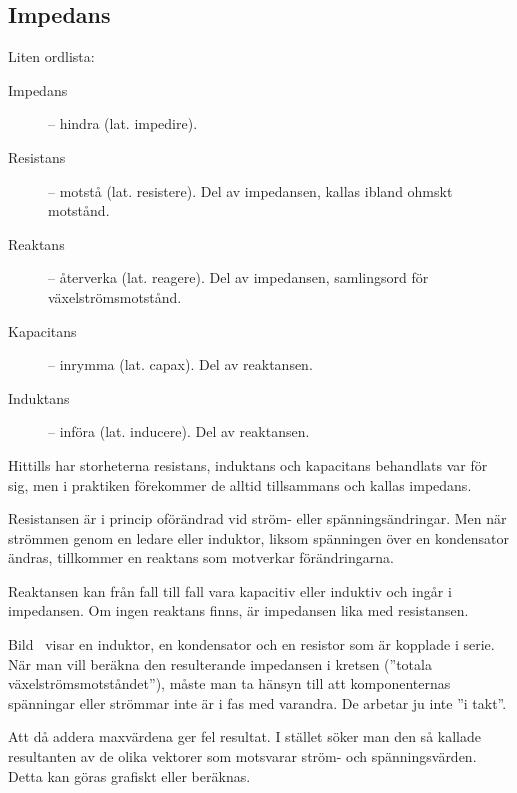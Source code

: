 \subsection{Impedans}
\label{impedans}

Liten ordlista:
\begin{description}
\item[Impedans] -- hindra (lat. impedire).
\item[Resistans] -- motstå (lat. resistere).
  Del av impedansen, kallas ibland ohmskt motstånd.
\item[Reaktans] -- återverka (lat. reagere).
  Del av impedansen, samlingsord för växelströmsmotstånd.
\item[Kapacitans] -- inrymma (lat. capax). Del av reaktansen.
\item[Induktans] -- införa (lat. inducere). Del av reaktansen.
\end{description}

Hittills har storheterna resistans, induktans och kapacitans behandlats var för
sig, men i praktiken förekommer de alltid tillsammans och kallas impedans.

Resistansen är i princip oförändrad vid ström- eller spänningsändringar.
Men när strömmen genom en ledare eller induktor, liksom spänningen över en
kondensator ändras, tillkommer en reaktans som motverkar förändringarna.

Reaktansen kan från fall till fall vara kapacitiv eller induktiv och ingår i
impedansen.
Om ingen reaktans finns, är impedansen lika med resistansen.


Bild~ visar en induktor, en kondensator och en resistor
som är kopplade i serie.
När man vill beräkna den resulterande impedansen i kretsen
(''totala växelströmsmotståndet''), måste man ta hänsyn till att komponenternas
spänningar eller strömmar inte är i fas med varandra.
De arbetar ju inte ''i takt''.

Att då addera maxvärdena ger fel resultat.
I stället söker man den så kallade resultanten av de olika vektorer som
motsvarar ström- och spänningsvärden.
Detta kan göras grafiskt eller beräknas.



